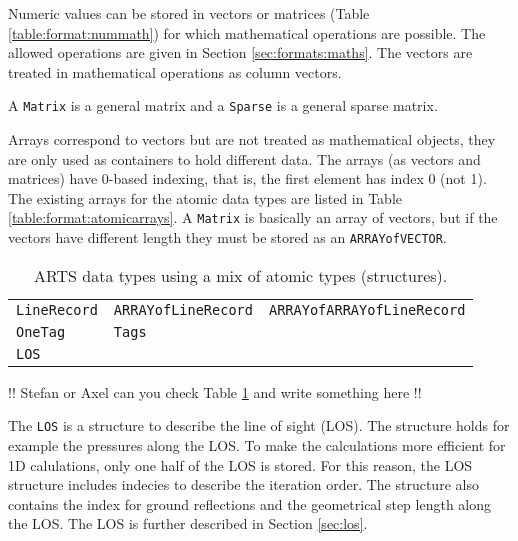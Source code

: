 Numeric values can be stored in vectors or matrices (Table
\ref{table:format:nummath}) for which mathematical operations are
possible. The allowed operations are given in Section
\ref{sec:formats:maths}.  The vectors are treated in mathematical
operations as column vectors.

A \verb|Matrix| is a general matrix and a \verb|Sparse| is a general
sparse matrix. 



 \label{sec:formats:atomic_arrays}
 
Arrays correspond to vectors but are not treated as mathematical
objects, they are only used as containers to hold different data.
The arrays (as vectors and matrices) have 0-based indexing, that is,
the first element has index 0 (not 1). The existing arrays for the
atomic data types are listed in Table \ref{table:format:atomicarrays}.
A \verb|Matrix| is basically an array of vectors, but if the vectors
have different length they must be stored as an \verb|ARRAYofVECTOR|.


 \label{sec:formats:others}

 \begin{table}[t]
  \begin{tabular}{l l l}
   \verb|LineRecord| & \verb|ARRAYofLineRecord| & \verb|ARRAYofARRAYofLineRecord| \\
   \verb|OneTag|     & \verb|Tags|   & \\
   \verb|LOS| & & \\
  \end{tabular}
  \caption{ARTS data types using a mix of atomic types (structures).}
  \label{table:format:structures}
 \end{table}
 
!! Stefan or Axel can you check Table \ref{table:format:structures} and
write something here !!

The \verb|LOS| is a structure to describe the line of sight (LOS).
The structure holds for example the pressures along the LOS. To make the
calculations more efficient for 1D calulations, only one half of the
LOS is stored.  For this reason, the LOS structure includes indecies
to describe the iteration order. The structure also contains the
index for ground reflections and the geometrical step length along
the LOS. The LOS is further described in Section \ref{sec:los}.


 \label{sec:formats:maths}
 
